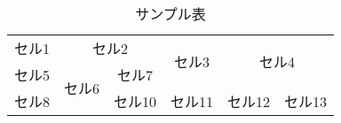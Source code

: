 \documentclass{article}
\begin{document}
\begin{table}[htbp]
\centering
\caption{サンプル表}
\begin{tabular}{c|c|c|c|cc} \hline \hline
セル1 &	\multicolumn{2}{c|}{セル2} & \multirow{2}{*}{セル3} & \multicolumn{2}{c}{\multirow{2}{*}{セル4}} \\ \cline{1-3}
セル5 & \multirow{2}{*}{セル6}     &    セル7    &          &                            &               \\ \cline{1-1} \cline{3-6}
セル8 &                            &    セル10   &  セル11  &\multicolumn{1}{c|}{セル12} &セル13         \\ \hline
\end{tabular}
\end{table}
\end{document}
